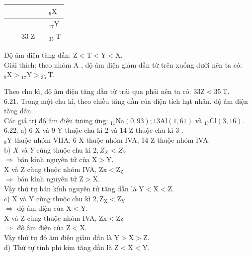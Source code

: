 \documentclass[10pt]{article}
\begin{document}
\begin{center}
\begin{tabular}{|l|l|l|l|l|}
\hline
 &  &  &  & ${ }_{9} \mathrm{X}$ \\
\hline
 &  &  &  & ${ }_{17} \mathrm{Y}$ \\
\hline
 &  & 33 Z &  & ${ }_{35} \mathrm{~T}$ \\
\hline
\end{tabular}
\end{center}

Độ âm điện tăng dần: $\mathrm{Z}<\mathrm{T}<\mathrm{Y}<\mathrm{X}$.\\
Giải thích: theo nhóm A , độ âm điện giảm dần từ trên xuống dưới nên ta có: ${ }_{9} \mathrm{X}>{ }_{17} \mathrm{Y}>{ }_{35} \mathrm{~T}$.

Theo chu kì, độ âm điện tăng dần từ trái qua phải nên ta có: $33 \mathrm{Z}<35 \mathrm{~T}$.\\
6.21. Trong một chu kì, theo chiều tăng dần của điện tích hạt nhân, độ âm điện tăng dần.\\
Các giá trị độ âm điện tương ứng: ${ }_{11} \mathrm{Na}(0,93) ; 13 \mathrm{Al}(1,61)$ và ${ }_{17} \mathrm{Cl}(3,16)$.\\
6.22. a) 6 X và 9 Y thuộc chu kì 2 và 14 Z thuộc chu kì 3 .\\
${ }_{9} \mathrm{Y}$ thuộc nhóm VIIA, 6 X thuộc nhóm IVA, 14 Z thuộc nhóm IVA.\\
b) $X$ và $Y$ cùng thuộc chu kì $2, Z_{X}<Z_{Y}$\\
$\Rightarrow$ bán kính nguyên tử của $\mathrm{X}>\mathrm{Y}$.\\
X và Z cùng thuộc nhóm IVA, $\mathrm{Zx}<\mathrm{Z}_{\mathrm{Z}}$\\
$\Rightarrow$ bán kính nguyên tử $\mathrm{Z}>\mathrm{X}$.\\
Vậy thứ tự bán kính nguyên tử tăng dần là $\mathrm{Y}<\mathrm{X}<\mathrm{Z}$.\\
c) X và Y cùng thuộc chu kì $2, \mathrm{Z}_{\mathrm{X}}<\mathrm{Z}_{\mathrm{Y}}$\\
$\Rightarrow$ độ âm điện của $\mathrm{X}<\mathrm{Y}$.\\
X và Z cùng thuộc nhóm IVA, $\mathrm{Zx}<\mathrm{Zz}$\\
$\Rightarrow$ độ âm điện của $\mathrm{Z}<\mathrm{X}$.\\
Vậy thứ tự độ âm điện giảm dần là $\mathrm{Y}>\mathrm{X}>\mathrm{Z}$.\\
d) Thứ tự tính phi kim tăng dần là $\mathrm{Z}<\mathrm{X}<\mathrm{Y}$.\\
\end{document}
